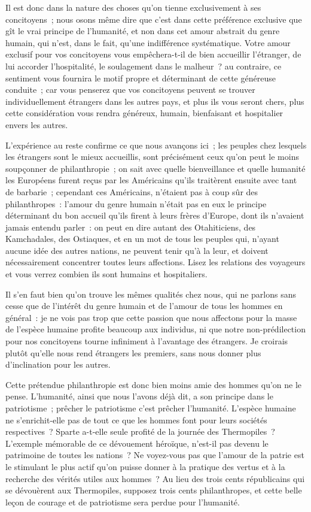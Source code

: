 \documentclass[french,twoside]{book} %
\begin{document}
Il est donc dans la nature des choses qu’on tienne exclusivement à ses concitoyens ; nous osons même dire que c’est dans cette préférence exclusive que gît le vrai principe de l’humanité, et non dans cet amour abstrait du genre humain, qui n’est, dans le fait, qu’une indifférence systématique. Votre amour exclusif pour vos concitoyens vous empêchera-t-il de bien accueillir l’étranger, de lui accorder l’hospitalité, le soulagement dans le malheur ? au contraire, ce sentiment vous fournira le motif propre et déterminant de cette généreuse conduite ; car vous penserez que vos concitoyens peuvent se trouver individuellement étrangers dans les autres pays, et plus ils vous seront chers, plus cette considération vous rendra généreux, humain, bienfaisant et hospitalier envers les autres.\par
L’expérience au reste confirme ce que nous avançons ici ; les peuples chez lesquels les étrangers sont le mieux accueillis, sont précisément ceux qu’on peut le moins soupçonner de philanthropie ; on sait avec quelle bienveillance et quelle humanité les Européens furent reçus par les Américains qu’ils traitèrent ensuite avec tant de barbarie ; cependant ces Américains, n’étaient pas à coup sûr des philanthropes : l’amour du genre humain n’était pas en eux le principe déterminant du bon accueil qu’ils firent à leurs frères d’Europe, dont ils n’avaient jamais entendu parler : on peut en dire autant des Otahiticiens, des Kamchadales, des Ostiaques, et en un mot de tous les peuples qui, n’ayant aucune idée des autres nations, ne peuvent tenir qu’à la leur, et doivent nécessairement concentrer toutes leurs affections. Lisez les relations des voyageurs et vous verrez combien ils sont humains et hospitaliers.\par
Il s’en faut bien qu’on trouve les mêmes qualités chez nous, qui ne parlons sans cesse que de l’intérêt du genre humain et de l’amour de tous les hommes en général : je ne vois pas trop que cette passion que nous affectons pour la masse de l’espèce humaine profite beaucoup aux individus, ni que notre non-prédilection pour nos concitoyens tourne infiniment à l’avantage des étrangers. Je croirais plutôt qu’elle nous rend étrangers les premiers, sans nous donner plus d’inclination pour les autres.\par
Cette prétendue philanthropie est donc bien moins amie des hommes qu’on ne le pense. L’humanité, ainsi que nous l’avons déjà dit, a son principe dans le patriotisme ; prêcher le patriotisme c’est prêcher l’humanité. L’espèce humaine ne s’enrichit-elle pas de tout ce que les hommes font pour leurs sociétés respectives ? Sparte a-t-elle seule profité de la journée des Thermopiles ? L’exemple mémorable de ce dévouement héroïque, n’est-il pas devenu le patrimoine de toutes les nations ? Ne voyez-vous pas que l’amour de la patrie est le stimulant le plus actif qu’on puisse donner à la pratique des vertus et à la recherche des vérités utiles aux hommes ? Au lieu des trois cents républicains qui se dévouèrent aux Thermopiles, supposez trois cents philanthropes, et cette belle leçon de courage et de patriotisme sera perdue pour l’humanité.\par
\end{document}
